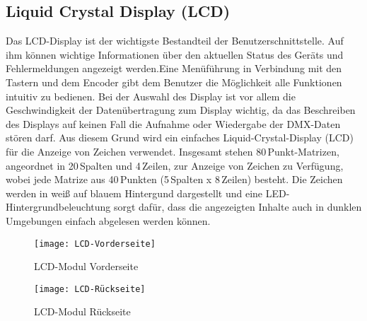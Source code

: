 
\subsection{Liquid Crystal Display (LCD)}
\label{sec:HardLCD}
Das LCD-Display ist der wichtigste Bestandteil der Benutzerschnittstelle. Auf ihm können wichtige Informationen über den aktuellen Status des Geräts und Fehlermeldungen angezeigt werden.Eine Menüführung in Verbindung mit den Tastern und dem Encoder gibt dem Benutzer die Möglichkeit alle Funktionen intuitiv zu bedienen. Bei der Auswahl des Display ist vor allem die Geschwindigkeit der Datenübertragung zum Display wichtig, da das Beschreiben des Displays auf keinen Fall die Aufnahme oder Wiedergabe der DMX-Daten stören darf. Aus diesem Grund wird ein einfaches Liquid-Crystal-Display (LCD) für die Anzeige von Zeichen verwendet. Insgesamt stehen 80\,Punkt-Matrizen, angeordnet in 20\,Spalten und 4\,Zeilen, zur Anzeige von Zeichen zu Verfügung, wobei jede Matrize aus 40\,Punkten (5\,Spalten x 8\,Zeilen) besteht. Die Zeichen werden in weiß auf blauem Hintergund dargestellt und eine LED-Hintergrundbeleuchtung sorgt dafür, dass die angezeigten Inhalte auch in dunklen Umgebungen einfach abgelesen werden können.
\begin{figure}[h]
	\begin{minipage}{.45\linewidth}
		\centering
		\texttt{[image: LCD-Vorderseite]}
		\caption{LCD-Modul Vorderseite}
		\label{fig:LCD-front}
	\end{minipage}
	\hfill
	\begin{minipage}{.45\linewidth}
		\centering
		\texttt{[image: LCD-Rückseite]}
		\caption{LCD-Modul Rückseite}
		\label{fig:LCD-back}
	\end{minipage}
\end{figure}
